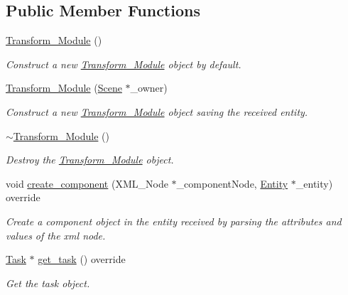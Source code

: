 \subsection*{Public Member Functions}
\begin{DoxyCompactItemize}
\item 
\mbox{\hyperlink{classbanita_1_1_transform___module_a881143ab58437a85c5d4c02dca1e4336}{Transform\+\_\+\+Module}} ()
\begin{DoxyCompactList}\small\item\em Construct a new \mbox{\hyperlink{classbanita_1_1_transform___module}{Transform\+\_\+\+Module}} object by default. \end{DoxyCompactList}\item 
\mbox{\hyperlink{classbanita_1_1_transform___module_aa698fc7ef98d9a075ef0a5dad9fa18ef}{Transform\+\_\+\+Module}} (\mbox{\hyperlink{classbanita_1_1_scene}{Scene}} $\ast$\+\_\+owner)
\begin{DoxyCompactList}\small\item\em Construct a new \mbox{\hyperlink{classbanita_1_1_transform___module}{Transform\+\_\+\+Module}} object saving the received entity. \end{DoxyCompactList}\item 
\mbox{\hyperlink{classbanita_1_1_transform___module_a22ef547c4e2766126a571aeaf4679fc0}{$\sim$\+Transform\+\_\+\+Module}} ()
\begin{DoxyCompactList}\small\item\em Destroy the \mbox{\hyperlink{classbanita_1_1_transform___module}{Transform\+\_\+\+Module}} object. \end{DoxyCompactList}\item 
void \mbox{\hyperlink{classbanita_1_1_transform___module_a2a1181f23617bb6dfe71e1f7e16945e9}{create\+\_\+component}} (X\+M\+L\+\_\+\+Node $\ast$\+\_\+component\+Node, \mbox{\hyperlink{classbanita_1_1_entity}{Entity}} $\ast$\+\_\+entity) override
\begin{DoxyCompactList}\small\item\em Create a component object in the entity received by parsing the attributes and values of the xml node. \end{DoxyCompactList}\item 
\mbox{\hyperlink{classbanita_1_1_task}{Task}} $\ast$ \mbox{\hyperlink{classbanita_1_1_transform___module_a6cee3919fd2b22f82c41f056ac87e546}{get\+\_\+task}} () override
\begin{DoxyCompactList}\small\item\em Get the task object. \end{DoxyCompactList}\end{DoxyCompactItemize}
